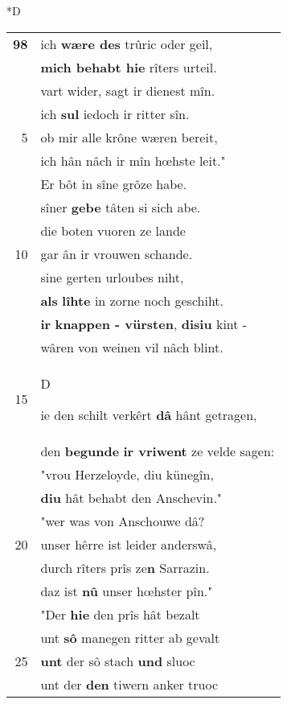 \documentclass[8pt,a4paper,notitlepage]{article}
\begin{document}
\begin{table}[ht]
\begin{minipage}[t]{0.5\linewidth}
\small
\begin{center}*D
\end{center}
\begin{tabular}{rl}
\textbf{98} & ich \textbf{wære des} trûric oder geil,\\ 
 & \textbf{mich behabt hie} rîters urteil.\\ 
 & vart wider, sagt ir dienest mîn.\\ 
 & ich \textbf{sul} iedoch ir ritter sîn.\\ 
5 & ob mir alle krône wæren bereit,\\ 
 & ich hân nâch ir mîn hœhste leit."\\ 
 & Er bôt in sîne grôze habe.\\ 
 & sîner \textbf{gebe} tâten si sich abe.\\ 
 & die boten vuoren ze lande\\ 
10 & gar ân ir vrouwen schande.\\ 
 & sine gerten urloubes niht,\\ 
 & \textbf{als} \textbf{lîhte} in zorne noch geschiht.\\ 
 & \textbf{ir} \textbf{knappen - vürsten}, \textbf{disiu} kint -\\ 
 & wâren von weinen vil nâch blint.\\ 
15 & \begin{large}D\end{large}ie den schilt verkêrt \textbf{dâ} hânt getragen,\\ 
 & den \textbf{begunde} \textbf{ir vriwent} ze velde sagen:\\ 
 & "vrou Herzeloyde, diu künegîn,\\ 
 & \textbf{diu} hât behabt den Anschevin."\\ 
 & "wer was von Anschouwe dâ?\\ 
20 & unser hêrre ist leider anderswâ,\\ 
 & durch rîters prîs ze\textbf{n} Sarrazin.\\ 
 & daz ist \textbf{nû} unser hœhster pîn."\\ 
 & "Der \textbf{hie} den prîs hât bezalt\\ 
 & unt \textbf{sô} manegen ritter ab gevalt\\ 
25 & \textbf{unt} der sô stach \textbf{und} sluoc\\ 
 & unt der \textbf{den} tiwern anker truoc\\ 

\end{tabular}
\end{minipage}
\end{table}
\end{document}
